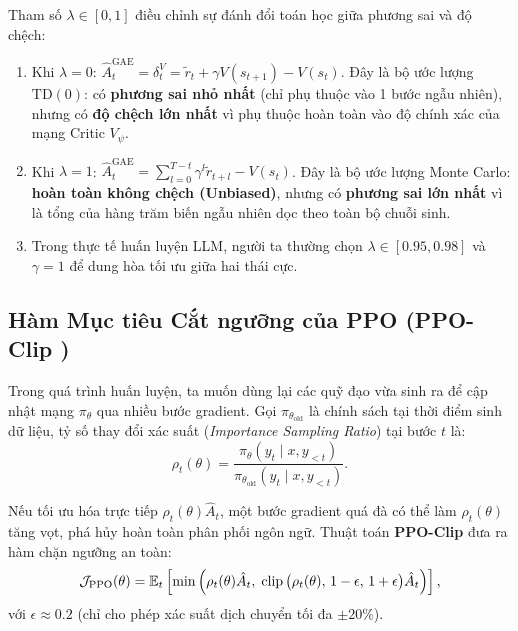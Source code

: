 \begin{theorem}
Tham số $\lambda \in [0, 1]$ điều chỉnh sự đánh đổi toán học giữa phương sai và độ chệch:
\begin{enumerate}[label=(\alph*), leftmargin=1.2cm]
    \item Khi $\lambda = 0$: $\hat{A}_t^{\text{GAE}} = \delta_t^V = \tilde{r}_t + \gamma V(s_{t+1}) - V(s_t)$. Đây là bộ ước lượng $\text{TD}(0)$: có \textbf{phương sai nhỏ nhất} (chỉ phụ thuộc vào 1 bước ngẫu nhiên), nhưng có \textbf{độ chệch lớn nhất} vì phụ thuộc hoàn toàn vào độ chính xác của mạng Critic $V_\psi$.
    \item Khi $\lambda = 1$: $\hat{A}_t^{\text{GAE}} = \sum_{l=0}^{T-t} \gamma^l \tilde{r}_{t+l} - V(s_t)$. Đây là bộ ước lượng Monte Carlo: \textbf{hoàn toàn không chệch (Unbiased)}, nhưng có \textbf{phương sai lớn nhất} vì là tổng của hàng trăm biến ngẫu nhiên dọc theo toàn bộ chuỗi sinh.
    \item Trong thực tế huấn luyện LLM, người ta thường chọn $\lambda \in [0.95, 0.98]$ và $\gamma = 1$ để dung hòa tối ưu giữa hai thái cực.
\end{enumerate}
\end{theorem}

\subsection{Hàm Mục tiêu Cắt ngưỡng của PPO (PPO-Clip \citealt{schulman2017proximal})}
Trong quá trình huấn luyện, ta muốn dùng lại các quỹ đạo vừa sinh ra để cập nhật mạng $\pi_\theta$ qua nhiều bước gradient. Gọi $\pi_{\theta_{\text{old}}}$ là chính sách tại thời điểm sinh dữ liệu, tỷ số thay đổi xác suất (\textit{Importance Sampling Ratio}) tại bước $t$ là:
\begin{equation}
    \rho_t(\theta) = \frac{\pi_\theta(y_t \mid x, y_{<t})}{\pi_{\theta_{\text{old}}}(y_t \mid x, y_{<t})}.
\end{equation}

Nếu tối ưu hóa trực tiếp $\rho_t(\theta) \hat{A}_t$, một bước gradient quá đà có thể làm $\rho_t(\theta)$ tăng vọt, phá hủy hoàn toàn phân phối ngôn ngữ. Thuật toán \textbf{PPO-Clip} \citep{schulman2017proximal} đưa ra hàm chặn ngưỡng an toàn:
\begin{equation}
    \mathcal{J}_{\text{PPO}}(\theta) = \operatorname{\mathbb{E}}_t \left[ \min\Big( \rho_t(\theta) \hat{A}_t,\; \operatorname{\mathrm{clip}}\big(\rho_t(\theta),\, 1-\epsilon,\, 1+\epsilon\big) \hat{A}_t \Big) \right],
    \label{eq:ppo_clip}
\end{equation}
với $\epsilon \approx 0.2$ (chỉ cho phép xác suất dịch chuyển tối đa $\pm 20\%$).

